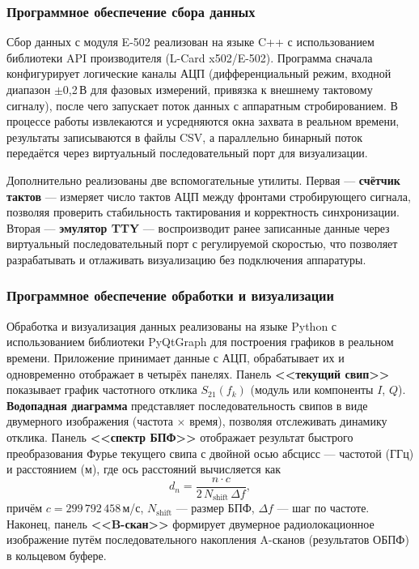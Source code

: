 \subsubsection{Программное обеспечение сбора данных}

Сбор данных с модуля E-502 реализован на языке C++ с использованием
библиотеки API производителя (L-Card x502/E-502). Программа сначала
конфигурирует логические каналы АЦП (дифференциальный режим, входной диапазон
$\pm$0{,}2\,В для фазовых измерений, привязка к внешнему тактовому сигналу),
после чего запускает поток данных с аппаратным стробированием. В процессе
работы извлекаются и усредняются окна захвата в реальном времени, результаты
записываются в файлы CSV, а параллельно бинарный поток передаётся через
виртуальный последовательный порт для визуализации.

Дополнительно реализованы две вспомогательные утилиты. Первая ---
\textbf{счётчик тактов} --- измеряет число тактов АЦП между фронтами
стробирующего сигнала, позволяя проверить стабильность тактирования и
корректность синхронизации. Вторая --- \textbf{эмулятор TTY} ---
воспроизводит ранее записанные данные через виртуальный последовательный порт
с регулируемой скоростью, что позволяет разрабатывать и отлаживать
визуализацию без подключения аппаратуры.

\subsubsection{Программное обеспечение обработки и визуализации}

Обработка и визуализация данных реализованы на языке Python с использованием
библиотеки PyQtGraph для построения графиков в реальном времени. Приложение
принимает данные с АЦП, обрабатывает их и одновременно отображает в четырёх
панелях. Панель \textbf{<<текущий свип>>} показывает график частотного отклика
$S_{21}(f_k)$ (модуль или компоненты $I$, $Q$). \textbf{Водопадная диаграмма}
представляет последовательность свипов в виде двумерного изображения
(частота $\times$ время), позволяя отслеживать динамику отклика. Панель
\textbf{<<спектр БПФ>>} отображает результат быстрого преобразования Фурье
текущего свипа с двойной осью абсцисс --- частотой (ГГц) и расстоянием (м),
где ось расстояний вычисляется как
\begin{equation}
    d_n = \frac{n \cdot c}{2\,N_{\mathrm{shift}}\,\Delta f},
    \label{eq:distance-axis}
\end{equation}
причём $c = 299\,792\,458$\,м/с, $N_{\mathrm{shift}}$ --- размер БПФ,
$\Delta f$ --- шаг по частоте. Наконец, панель \textbf{<<B-скан>>} формирует
двумерное радиолокационное изображение путём последовательного накопления
A-сканов (результатов ОБПФ) в кольцевом буфере.

